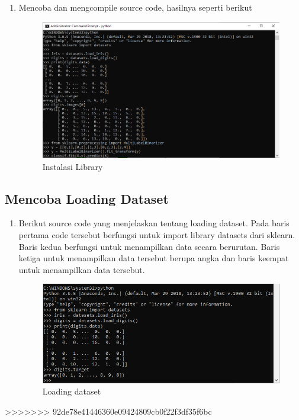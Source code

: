 \begin{enumerate}
\item Mencoba dan mengcompile source code, hasilnya seperti berikut
\begin{figure}[ht]
\centering
\includegraphics[scale=0.5]{figures/19.png}
\caption{Instalasi Library}
\end{figure}
\end{enumerate}

\subsection{Mencoba Loading Dataset}
\begin{enumerate}
\item Berikut source code yang menjelaskan tentang loading dataset. Pada baris pertama code tersebut berfungsi untuk import library datasets dari sklearn. Baris kedua berfungsi untuk menampilkan data secara berurutan. Baris ketiga untuk menampilkan data tersebut berupa angka dan baris keempat untuk menampilkan data tersebut.
\begin{figure}[ht]
\centering
\includegraphics[scale=0.5]{figures/20.png}
\caption{Loading dataset}
\end{figure}
\end{enumerate}
>>>>>>> 92de78e41446360e09424809cb0f22f3df35f6bc


